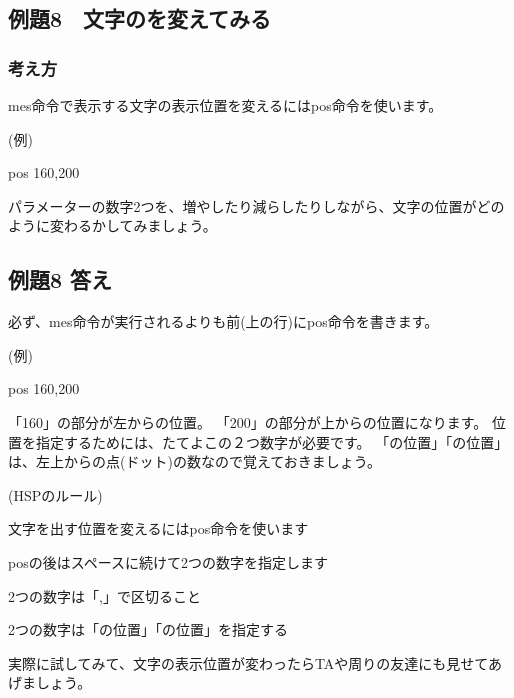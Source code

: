 \clearpage

\subsection{例題8　文字のを変えてみる}

\subsubsection*{考え方}

mes命令で表示する文字の表示位置を変えるにはpos命令を使います。

\begin{description}
    \item (例)
    \item pos 160,200
\end{description}

パラメーターの数字2つを、増やしたり減らしたりしながら、文字の位置がどのように変わるかしてみましょう。

\subsection*{例題8 答え}

必ず、mes命令が実行されるよりも前(上の行)にpos命令を書きます。

\begin{description}
    \item (例)
    \item pos 160,200
\end{description}

「160」の部分が左からの位置。
「200」の部分が上からの位置になります。
位置を指定するためには、たてよこの２つ数字が必要です。
「の位置」「の位置」は、左上からの点(ドット)の数なので覚えておきましょう。

\begin{description}
    \item (HSPのルール)
\end{description}

\begin{description}
    \item 文字を出す位置を変えるにはpos命令を使います
    \item posの後はスペースに続けて2つの数字を指定します
    \item 2つの数字は「,」で区切ること
    \item 2つの数字は「の位置」「の位置」を指定する
\end{description}

実際に試してみて、文字の表示位置が変わったらTAや周りの友達にも見せてあげましょう。
